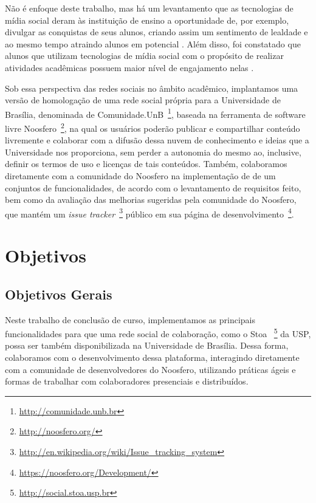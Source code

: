  
 
Não é enfoque deste trabalho, mas há um levantamento que as tecnologias de mídia social deram às
instituição de ensino a oportunidade de, por exemplo, divulgar as conquistas de seus alunos,
criando assim um sentimento de lealdade e ao mesmo tempo atraindo alunos em
potencial \cite{solis2008}. 
%
Além disso, foi constatado que alunos que utilizam tecnologias de mídia social
com o propósito de realizar atividades acadêmicas possuem maior nível de
engajamento nelas  \cite{ccsse2009}. 
 
 
Sob essa perspectiva das redes sociais no âmbito acadêmico, implantamos uma versão de homologação
de uma rede social própria para a Universidade de
Brasília, denominada de Comunidade.UnB~\footnote{\url{http://comunidade.unb.br}}, baseada na ferramenta de software livre 
Noosfero~\footnote{\url{http://noosfero.org/}},
na qual os usuários poderão publicar e compartilhar conteúdo livremente e
colaborar com a difusão dessa nuvem de conhecimento e ideias que a Universidade
nos proporciona, sem perder a autonomia do mesmo ao, inclusive, definir os termos
de uso e licenças de tais conteúdos.
%
Também, colaboramos diretamente com a comunidade do Noosfero na implementação de
de um conjuntos de funcionalidades, de acordo com o levantamento de requisitos feito,
bem como da avaliação das melhorias sugeridas pela comunidade do Noosfero, que mantém
um \textit{issue tracker}~\footnote{\url{http://en.wikipedia.org/wiki/Issue_tracking_system}}
público em sua página de desenvolvimento~\footnote{\url{https://noosfero.org/Development/}}.
 
 
\section{Objetivos}
 
\subsection{Objetivos Gerais}
 
Neste trabalho de conclusão de curso, implementamos as
principais funcionalidades para que uma rede social de colaboração, como o Stoa
~\footnote{\url{http://social.stoa.usp.br}} da USP, 
possa ser também disponibilizada na Universidade de Brasília. 
%
Dessa forma, colaboramos com o desenvolvimento dessa plataforma, interagindo diretamente com
a  comunidade de desenvolvedores do Noosfero, utilizando práticas ágeis e formas de trabalhar
com colaboradores presenciais e distribuídos.
 
